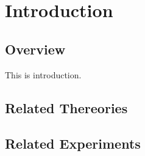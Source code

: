 \chapter{Introduction}

\section{Overview}
This is introduction. \cite{Chatrchyan:2008aa}

\section{Related Thereories}

\section{Related Experiments}

